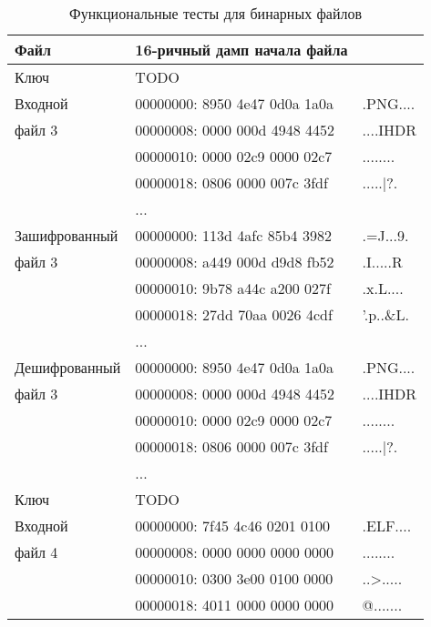 \begin{table}[ht!]
    \begin{center}
        \caption{Функциональные тесты для бинарных файлов}
        \label{}
        \begin{tabular}{|l|ll|}
            \hline
            Файл & 16-ричный дамп начала файла & \\
			\hline
            \hline
            Ключ          & TODO & \\
            \hline
            Входной       & 00000000: 8950 4e47 0d0a 1a0a & .PNG.... \\
            файл 3        & 00000008: 0000 000d 4948 4452 & ....IHDR \\
                          & 00000010: 0000 02c9 0000 02c7 & ........ \\
                          & 00000018: 0806 0000 007c 3fdf & .....|?. \\
                          & ... & \\
            \hline
            Зашифрованный & 00000000: 113d 4afc 85b4 3982 & .=J...9. \\
            файл 3        & 00000008: a449 000d d9d8 fb52 & .I.....R \\
                          & 00000010: 9b78 a44c a200 027f & .x.L.... \\
                          & 00000018: 27dd 70aa 0026 4cdf & '.p..\&L. \\
                          & ... & \\
            \hline
            Дешифрованный & 00000000: 8950 4e47 0d0a 1a0a & .PNG.... \\
            файл 3        & 00000008: 0000 000d 4948 4452 & ....IHDR \\
                          & 00000010: 0000 02c9 0000 02c7 & ........ \\
                          & 00000018: 0806 0000 007c 3fdf & .....|?. \\
                          & ... & \\
            \hline
            \hline
            Ключ          & TODO & \\
            \hline
            Входной       & 00000000: 7f45 4c46 0201 0100 & .ELF.... \\
            файл 4        & 00000008: 0000 0000 0000 0000 & ........ \\
                          & 00000010: 0300 3e00 0100 0000 & ..>..... \\
                          & 00000018: 4011 0000 0000 0000 & @....... \\

\end{tabular}
\end{center}
\end{table}
